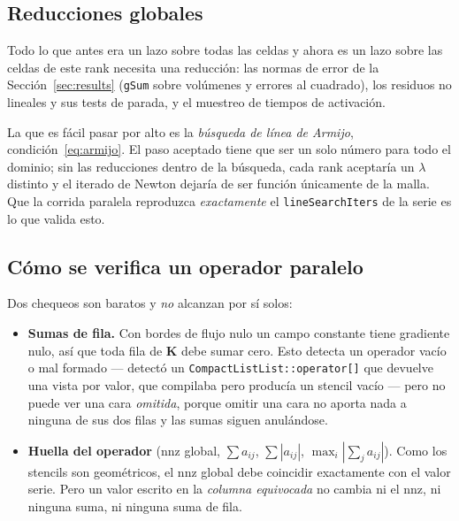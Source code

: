 \documentclass[11pt,a4paper]{article}
\newcommand{\code}[1]{\texttt{\small #1}}
\newcommand{\Kstif}{\mathbf{K}}
\begin{document}
\subsection{Reducciones globales}

Todo lo que antes era un lazo sobre todas las celdas y ahora es un lazo sobre las
celdas de este rank necesita una reducción: las normas de error de la
Sección~\ref{sec:results} (\code{gSum} sobre volúmenes y errores al cuadrado),
los residuos no lineales y sus tests de parada, y el muestreo de tiempos de
activación.

La que es fácil pasar por alto es la \emph{búsqueda de línea de Armijo},
condición~\eqref{eq:armijo}. El paso aceptado tiene que ser un solo número para
todo el dominio; sin las reducciones dentro de la búsqueda, cada rank aceptaría
un $\lambda$ distinto y el iterado de Newton dejaría de ser función únicamente de
la malla. Que la corrida paralela reproduzca \emph{exactamente} el
\code{lineSearchIters} de la serie es lo que valida esto.

\subsection{Cómo se verifica un operador paralelo}
\label{sec:dist-verif}

Dos chequeos son baratos y \emph{no} alcanzan por sí solos:

\begin{itemize}
  \item \textbf{Sumas de fila.} Con bordes de flujo nulo un campo constante tiene
        gradiente nulo, así que toda fila de $\Kstif$ debe sumar cero. Esto
        detecta un operador vacío o mal formado --- detectó un
        \code{CompactListList::operator[]} que devuelve una vista por valor, que
        compilaba pero producía un stencil vacío --- pero no puede ver una cara
        \emph{omitida}, porque omitir una cara no aporta nada a ninguna de sus
        dos filas y las sumas siguen anulándose.
  \item \textbf{Huella del operador} (nnz global, $\sum a_{ij}$,
        $\sum|a_{ij}|$, $\max_i |\sum_j a_{ij}|$). Como los stencils son
        geométricos, el nnz global debe coincidir exactamente con el valor serie.
        Pero un valor escrito en la \emph{columna equivocada} no cambia ni el
        nnz, ni ninguna suma, ni ninguna suma de fila.
\end{itemize}
\end{document}
